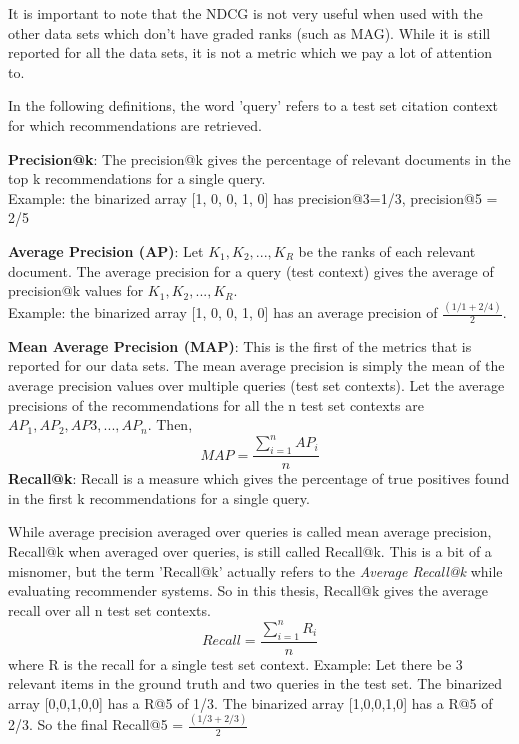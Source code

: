 It is important to note that the NDCG is not very useful when used with the other data sets which don't have graded ranks (such as MAG). While it is still reported for all the data sets, it is not a metric which we pay a lot of attention to.

In the following definitions, the word 'query' refers to a test set citation context for which recommendations are retrieved.

\textbf{Precision@k}: The precision@k gives the percentage of relevant documents in the top k recommendations for a single query. \\
Example: the binarized array [1, 0, 0, 1, 0] has precision@3=1/3, precision@5 = 2/5

\textbf{Average Precision (AP)}: Let $K_1,K_2,...,K_R$ be the ranks of each relevant document. The average precision for a query (test context) gives the average of precision@k values for $K_1,K_2,...,K_R$.\\
Example: the binarized array [1, 0, 0, 1, 0] has an average precision of $\frac{(1/1 + 2/4)}{2}$.

\textbf{Mean Average Precision (MAP)}: This is the first of the metrics that is reported for our data sets. The mean average precision is simply the mean of the average precision values over multiple queries (test set contexts).
Let the average precisions of the recommendations for all the n test set contexts are $AP_1, AP_2, AP3, ..., AP_n$. Then, 
\begin{equation*}
    MAP = \frac{\sum\limits_{i=1}^n AP_i}{n}
\end{equation*}
\textbf{Recall@k}:
Recall is a measure which gives the percentage of true positives found in the first k recommendations for a single query. 

While average precision averaged over queries is called mean average precision, Recall@k when averaged over queries, is still called Recall@k. This is a bit of a misnomer, but the term 'Recall@k' actually refers to the \textit{Average Recall@k} while evaluating recommender systems.
So in this thesis, Recall@k gives the average recall over all n test set contexts.
\begin{equation*}
    Recall = \frac{\sum\limits_{i=1}^n R_i}{n}
\end{equation*}
where R is the recall for a single test set context.
Example: Let there be 3 relevant items in the ground truth and two queries in the test set.
The binarized array [0,0,1,0,0] has a R@5 of 1/3. The binarized array [1,0,0,1,0] has a R@5 of 2/3. So the final Recall@5 = $\frac{(1/3 + 2/3)}{2}$

